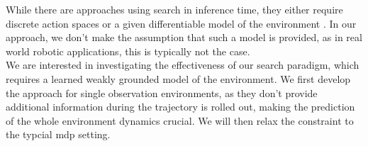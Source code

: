 While there are approaches using search in inference time, they either require discrete action spaces \cite{MUZero} or a given differentiable model of the environment \cite{Lee_Jeon_Kim_Kim_2020}. 
In our approach, we 
don't make the assumption that such a model is provided, as in real world robotic applications, this is typically not the case.\\

We are interested in investigating the effectiveness of our search paradigm, which requires a learned weakly grounded model of the environment. We first develop the approach 
for single observation environments, 
as they don't provide additional information during the trajectory is rolled out, making the prediction of the whole environment dynamics crucial. We will then relax the constraint to the typcial 
\ac{mdp} setting.